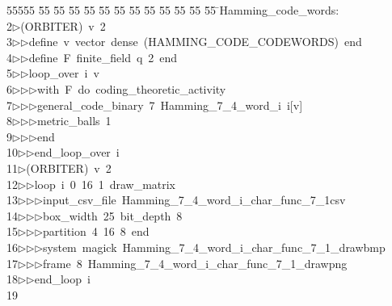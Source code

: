 %
%
\begin{tabbing}
55555 \= 55 \= 55 \= 55 \= 55 \= 55 \= 55 \= 55 \= 55 \= 55 \= 55 \= 55 \= 55 \= \>Hamming\_code\_words:\\[0pt]
2\>$\triangleright$\>(ORBITER)\ v\ 2\ \\[0pt]
3\>$\triangleright$\>$\triangleright$\>define\ v\ vector\ dense\ (HAMMING\_CODE\_CODEWORDS)\ end\ \\[0pt]
4\>$\triangleright$\>$\triangleright$\>define\ F\ finite\_field\ q\ 2\ end\ \\[0pt]
5\>$\triangleright$\>$\triangleright$\>loop\_over\ i\ v\ \\[0pt]
6\>$\triangleright$\>$\triangleright$\>$\triangleright$\>with\ F\ do\ coding\_theoretic\_activity\ \\[0pt]
7\>$\triangleright$\>$\triangleright$\>$\triangleright$\>general\_code\_binary\ 7\ Hamming\_7\_4\_word\_i\ i[v]\ \\[0pt]
8\>$\triangleright$\>$\triangleright$\>$\triangleright$\>metric\_balls\ 1\ \\[0pt]
9\>$\triangleright$\>$\triangleright$\>$\triangleright$\>end\ \\[0pt]
10\>$\triangleright$\>$\triangleright$\>end\_loop\_over\ i\\[0pt]
11\>$\triangleright$\>(ORBITER)\ v\ 2\ \\[0pt]
12\>$\triangleright$\>$\triangleright$\>loop\ i\ 0\ 16\ 1\ draw\_matrix\ \\[0pt]
13\>$\triangleright$\>$\triangleright$\>$\triangleright$\>input\_csv\_file\ Hamming\_7\_4\_word\_i\_char\_func\_7\_1csv\ \\[0pt]
14\>$\triangleright$\>$\triangleright$\>$\triangleright$\>box\_width\ 25\ bit\_depth\ 8\ \\[0pt]
15\>$\triangleright$\>$\triangleright$\>$\triangleright$\>partition\ 4\ 16\ 8\ end\ \\[0pt]
16\>$\triangleright$\>$\triangleright$\>$\triangleright$\>system\ magick\ Hamming\_7\_4\_word\_i\_char\_func\_7\_1\_drawbmp\ \\[0pt]
17\>$\triangleright$\>$\triangleright$\>$\triangleright$\>frame\ 8\ Hamming\_7\_4\_word\_i\_char\_func\_7\_1\_drawpng\ \\[0pt]
18\>$\triangleright$\>$\triangleright$\>end\_loop\ i\\[0pt]
19\>\end{tabbing}

